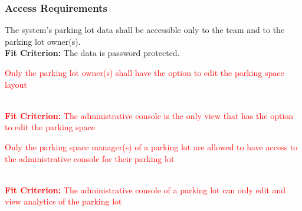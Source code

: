 \documentclass[12pt,letterpaper]{article}
\begin{document}
\subsubsection{Access Requirements}
\begin{enumerate}[{SR}1.] 
    \item The system's parking lot data shall be accessible only to the team and
    to the parking lot owner(s).\label{asr1} \\
    \textbf{Fit Criterion:} The data is password protected.
    \textcolor{red}{\item Only the parking lot owner(s) shall have the option to
    edit the parking space layout} \label{asr2} \\
    \textcolor{red}{\textbf{Fit Criterion:} The administrative console is the
    only view that has the option to edit the parking space}
    \textcolor{red}{\item Only the parking space manager(s) of a parking lot are
    allowed to have access to the administrative console for their parking lot}
    \label{asr3}\\
    \textcolor{red}{\textbf{Fit Criterion:} The administrative console of a
    parking lot can only edit and view analytics of the parking lot}
\end{enumerate}
\end{document}
